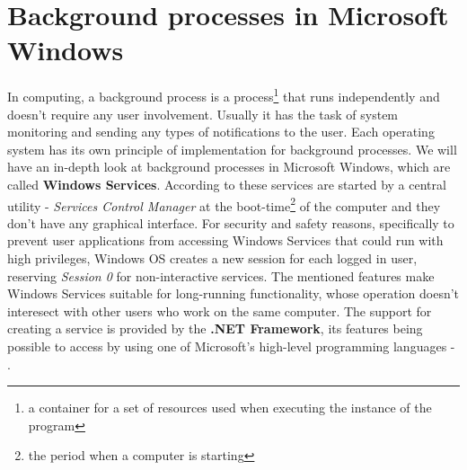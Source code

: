\section{Background processes in Microsoft Windows}
\label{section:backgroundProc}
In computing, a background process is a process\footnote{a container for a set of resources used when executing the instance of the program} that runs independently and doesn't require any user involvement. Usually it has the task of system monitoring and sending any types of notifications to the user. Each operating system has its own principle of implementation for background processes. We will have an in-depth look at background processes in Microsoft Windows, which are called \textbf{Windows Services}. According to \cite{winInternals} these services are started by a central utility - \textit{Services Control Manager} at the boot-time\footnote{the period when a computer is starting} of the computer and they don't have any graphical interface. For security and safety reasons, specifically to prevent user applications from accessing Windows Services that could run with high privileges, Windows OS creates a new session for each logged in user, reserving \textit{Session 0} for non-interactive services. The mentioned features make Windows Services suitable for long-running functionality, whose operation doesn't interesect with other users who work on the same computer. The support for creating a service is provided by the \textbf{.NET Framework}, its features being possible to access by using one of Microsoft's high-level programming languages - \CSharp.

